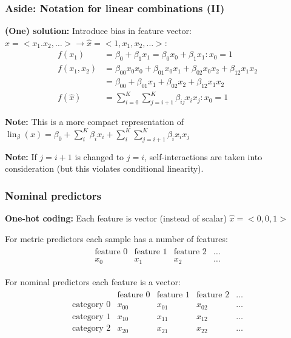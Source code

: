 \documentclass[usenames,dvipsnames,table]{beamer}
\begin{document}
\begin{frame}
\frametitle{Aside: Notation for linear combinations (II)}
\textbf{(One) solution:} Introduce bias in feature vector: $\widehat{x} = <x_1. x_2, \ldots> \rightarrow \widehat{x} = <1, x_1, x_2, \ldots>$:
\begin{align*}
f(x_1) &= \beta_0 + \beta_1 x_1 = \beta_0 x_0 + \beta_1 x_1 : x_0 = 1 \\
f(x_1, x_2) &= \beta_{00} x_0 x_0 + \beta_{01} x_0 x_1 + \beta_{02} x_0 x_2 + \beta_{12} x_1 x_2 \\
            &= \beta_{00} + \beta_{01} x_1 + \beta_{02} x_2 + \beta_{12} x_1 x_2 \\
f(\widehat{x})&= \sum_{i=0}^K \sum_{j=i+1}^K \beta_{ij} x_i x_j : x_0 = 1
\end{align*}

\textbf{Note:} This is a more compact representation of $\operatorname{lin}_{\beta}(x) = \beta_0 + \sum_i^K \beta_i x_i + \sum_i^K\sum_{j=i+1}^K \beta_i x_i x_j$

\textbf{Note:} If $j=i+1$ is changed to $j=i$, self-interactions are taken into consideration (but this violates conditional linearity).

\end{frame}










\begin{frame}
\frametitle{Nominal predictors}

\textbf{One-hot coding:} Each feature is vector (instead of scalar) $\widehat{x} = <0, 0, 1>$

For metric predictors each sample has a number of features:
\begin{align*}
    \begin{matrix}
    \textrm{feature 0} & \textrm{feature 1} & \textrm{feature 2} & \ldots \\
    x_0 & x_1 & x_2 & \ldots
    \end{matrix}
\end{align*}

For nominal predictors each feature is a vector:
\begin{align*}
    \begin{matrix}
    & \textrm{feature 0} & \textrm{feature 1} & \textrm{feature 2} & \ldots \\
    \textrm{category 0} & x_{00} & x_{01} & x_{02} & \ldots \\
    \textrm{category 1} & x_{10} & x_{11} & x_{12} & \ldots \\
    \textrm{category 2} & x_{20} & x_{21} & x_{22} & \ldots \\
    \end{matrix}
\end{align*}

\end{frame}
\end{document}
